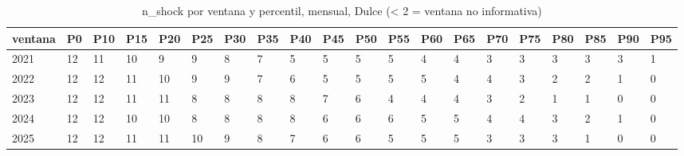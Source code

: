 \begin{table}[H]
\centering
\small
\caption{n\_shock por ventana y percentil, mensual, Dulce (< 2 = ventana no informativa)}
\label{tab:T_barrido_n_shock_mensual_dulce}
\begin{tabular}{llllllllllllllllllll}
\toprule
ventana & P0 & P10 & P15 & P20 & P25 & P30 & P35 & P40 & P45 & P50 & P55 & P60 & P65 & P70 & P75 & P80 & P85 & P90 & P95 \\
\midrule
2021 & 12 & 11 & 10 & 9 & 9 & 8 & 7 & 5 & 5 & 5 & 5 & 4 & 4 & 3 & 3 & 3 & 3 & 3 & 1 \\
2022 & 12 & 12 & 11 & 10 & 9 & 9 & 7 & 6 & 5 & 5 & 5 & 5 & 4 & 4 & 3 & 2 & 2 & 1 & 0 \\
2023 & 12 & 12 & 11 & 11 & 8 & 8 & 8 & 8 & 7 & 6 & 4 & 4 & 4 & 3 & 2 & 1 & 1 & 0 & 0 \\
2024 & 12 & 12 & 10 & 10 & 8 & 8 & 8 & 8 & 6 & 6 & 6 & 5 & 5 & 4 & 4 & 3 & 2 & 1 & 0 \\
2025 & 12 & 12 & 11 & 11 & 10 & 9 & 8 & 7 & 6 & 6 & 5 & 5 & 5 & 3 & 3 & 3 & 1 & 0 & 0 \\
\bottomrule
\end{tabular}
\end{table}